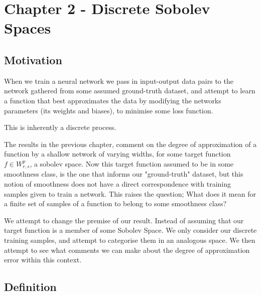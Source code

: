 \documentclass[11pt,a4paper]{article}
\theoremstyle{plain}
\theoremstyle{definition}
\theoremstyle{remark}
\begin{document}

\setcounter{section}{1} 
\section{Chapter 2 - Discrete Sobolev Spaces}

\subsection{Motivation}

When we train a neural network we pass in input-output data pairs to the network gathered from some assumed ground-truth dataset, and attempt to learn a function that best approximates the data by modifying the networks parameters (its weights and biases), to minimise some loss function. 

This is inherently a discrete process.

The results in the previous chapter, comment on the degree of approximation of a function by a shallow network of varying widths, for some target function \(f \in W^{p}_{r,s}\), a sobolev space. Now this target function assumed to be in some smoothness class, is the one that informs our "ground-truth" dataset, but this notion of smoothness does not have a direct correspondence with training samples given to train a network. This raises the question; What does it mean for a finite set of samples of a function to belong to some smoothness class?

We attempt to change the premise of our result. Instead of assuming that our target function is a member of some Sobolev Space. We only consider our discrete training samples, and attempt to categorise them in an analogous space. We then attempt to see what comments we can make about the degree of approximation error within this context.

\subsection{Definition}
\end{document}
